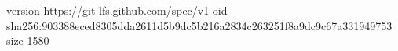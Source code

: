 version https://git-lfs.github.com/spec/v1
oid sha256:903388eced8305dda2611d5b9dc5b216a2834c263251f8a9dc9c67a331949753
size 1580

